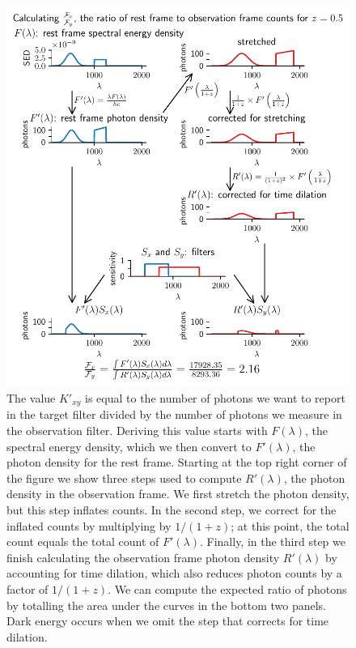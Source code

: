 \documentclass[aps,prl,reprint,amsmath,floatfix]{revtex4-2}
\begin{document}
\begin{figure}
  \includegraphics[width=\columnwidth]{k_equation_flow.pdf}
  \caption{The value $K'_{xy}$ is equal to the number of photons we want to
  report in the target filter divided by the number of photons we measure in
  the observation filter. Deriving this value starts with $F(\lambda)$, the
  spectral energy density, which we then convert to $F'(\lambda)$, the photon
  density for the rest frame. Starting at the top right corner of the figure we
  show three steps used to compute $R'(\lambda)$, the photon density in the
  observation frame. We first stretch the photon density, but this step
  inflates counts. In the second step, we correct for the inflated counts by
  multiplying by $1/(1+z)$; at this point, the total count equals the total
  count of $F'(\lambda)$. Finally, in the third step we finish calculating the
  observation frame photon density $R'(\lambda)$ by accounting for time
  dilation, which also reduces photon counts by a factor of $1/(1+z)$. We can
  compute the expected ratio of photons by totalling the area under the curves
  in the bottom two panels. Dark energy occurs when we omit the step that
  corrects for time dilation.
  }
  \label{fig:k-example}
\end{figure}
\end{document}
